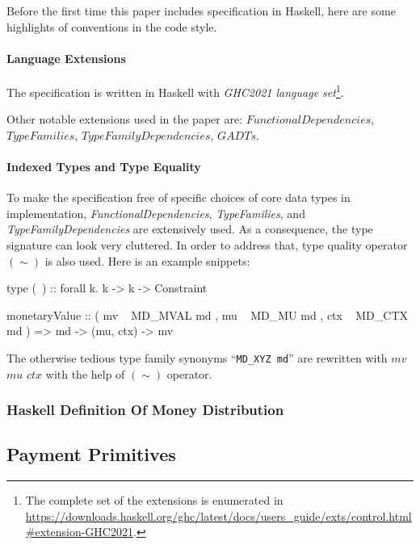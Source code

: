 Before the first time this paper includes specification in Haskell, here are some highlights of
conventions in the code style.

\paragraph{Language Extensions}

The specification is written in Haskell with \textit{GHC2021 language set}\footnote{The complete set
of the extensions is enumerated in
\url{https://downloads.haskell.org/ghc/latest/docs/users_guide/exts/control.html\#extension-GHC2021}.}.

Other notable extensions used in the paper are: $FunctionalDependencies$, $TypeFamilies$,
$TypeFamilyDependencies$, $GADTs$.

\paragraph{Indexed Types and Type Equality}

To make the specification free of specific choices of core data types in
implementation, \textit{FunctionalDependencies}, \textit{TypeFamilies},
and \textit{TypeFamilyDependencies} are extensively used. As a consequence, the type signature can
look very cluttered. In order to address that, type quality operator $(\sim)$ is also used. Here is
an example snippets:

\begin{code}
    type (~) :: forall k. k -> k -> Constraint

    monetaryValue :: ( mv  ~ MD_MVAL md
                     , mu  ~ MD_MU md
                     , ctx ~ MD_CTX md
                     )
                  => md -> (mu, ctx) -> mv
\end{code}

The otherwise tedious type family synonyms ``\texttt{MD_XYZ md}'' are rewritten with $mv$
$mu$ $ctx$ with the help of $(\sim)$ operator.

\subsubsection{Haskell Definition Of Money Distribution}



\subsection{Payment Primitives}

